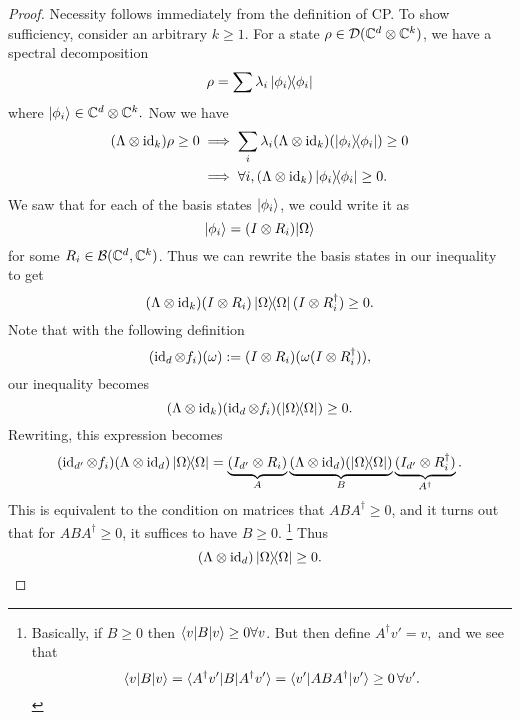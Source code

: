\begin{proof}
    Necessity follows immediately from the definition of CP. To show sufficiency, consider an arbitrary $k\geq 1$. For a state $\rho \in \mathcal{D}(\mathbb{C}^d \otimes \mathbb{C}^k)$, we have a spectral decomposition
    \begin{equation}
        \rho =\sum \lambda_i \left\lvert \phi_i \middle\rangle\!\middle\langle \phi_i \right\rvert
    \end{equation}
    where $\lvert\phi_i\rangle\in \mathbb{C}^d \otimes \mathbb{C}^k.$
    Now we have
    \begin{align}
        (\Lambda \otimes \text{id}_k)\rho \geq 0 &\implies \sum_i \lambda_i(\Lambda \otimes \operatorname{id}_k)(\left\lvert \phi_i \middle\rangle\!\middle\langle \phi_i \right\rvert)\geq 0\\
        &\implies \forall i, (\Lambda \otimes \operatorname{id}_k)\left\lvert \phi_i \middle\rangle\!\middle\langle \phi_i \right\rvert \geq 0.
    \end{align}
    We saw that for each of the basis states $\lvert\phi_i\rangle$, we could write it as
    \begin{equation}
        \lvert\phi_i\rangle=(I\otimes R_i)\lvert\Omega\rangle
    \end{equation}
    for some $R_i\in \mathcal{B}(\mathbb{C}^d, \mathbb{C}^k)$. Thus we can rewrite the basis states in our inequality to get
    \begin{equation}
        (\Lambda \otimes \operatorname{id}_k)(I\otimes R_i)\left\lvert \Omega \middle\rangle\!\middle\langle \Omega \right\rvert (I\otimes R_i^\dagger)\geq 0.
    \end{equation}
    Note that with the following definition
    \begin{equation}
        (\operatorname{id}_d \otimes f_i)(\omega) := (I\otimes R_i)(\omega(I\otimes R_i^\dagger)),
    \end{equation}
    our inequality becomes
    \begin{equation}
        (\Lambda \otimes \operatorname{id}_k)(\operatorname{id}_d \otimes f_i)(\left\lvert{\Omega}\middle\rangle\!\middle\langle{\Omega}\right\rvert) \geq 0.
    \end{equation}
    Rewriting, this expression becomes
    \begin{equation}
        (\operatorname{id}_{d'}\otimes f_i)(\Lambda \otimes \operatorname{id}_d)\left\lvert \Omega \middle\rangle\!\middle\langle \Omega \right\rvert = \underbrace{(I_{d'}\otimes R_i)}_A\underbrace{(\Lambda \otimes \operatorname{id}_d)(\left\lvert \Omega \middle\rangle\!\middle\langle \Omega \right\rvert)}_{B}\underbrace{(I_{d'}\otimes R_i^\dagger)}_{A^\dagger}.
    \end{equation}
    This is equivalent to the condition on matrices that $ABA^\dagger \geq 0$, and it turns out that for $ABA^\dagger \geq 0$, it suffices to have $B\geq 0$.%
        \footnote{Basically, if $B\geq 0$ then $\langle v\rvert B \lvert v\rangle\geq 0\forall v$. But then define $A^\dagger v' = v,$ and we see that 
        \begin{equation*}
            \langle v\rvert B\lvert v\rangle=\langle A^\dagger v'\rvert B\lvert A^\dagger v'\rangle=\langle v'\rvert A BA^\dagger \lvert v'\rangle\geq 0 \,\forall v'.
        \end{equation*}
        }
    Thus
    \begin{equation}
        (\Lambda \otimes \operatorname{id}_d)\left\lvert \Omega \middle\rangle\!\middle\langle \Omega \right\rvert \geq 0. \qedhere
    \end{equation}
\end{proof}

